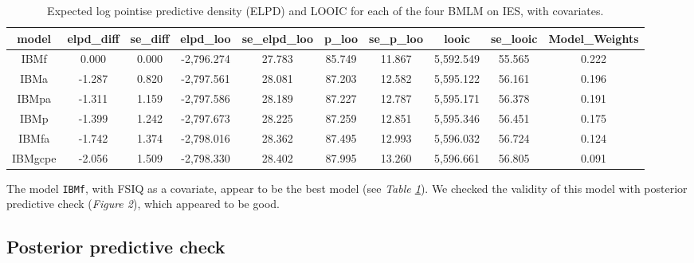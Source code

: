 \documentclass[
  11pt,
  english,
  ,doc,floatsintext]{apa6}
\begin{document}
\begin{table}[htb]

\begin{center}
\begin{threeparttable}

\caption{\label{tab:modelCompIES2}Expected log pointise predictive density (ELPD) and LOOIC for each of the four BMLM on IES, with covariates.}

\tiny{

\begin{tabular}{cccccccccc}
\toprule
model & \multicolumn{1}{c}{elpd\_diff} & \multicolumn{1}{c}{se\_diff} & \multicolumn{1}{c}{elpd\_loo} & \multicolumn{1}{c}{se\_elpd\_loo} & \multicolumn{1}{c}{p\_loo} & \multicolumn{1}{c}{se\_p\_loo} & \multicolumn{1}{c}{looic} & \multicolumn{1}{c}{se\_looic} & \multicolumn{1}{c}{Model\_Weights}\\
\midrule
IBMf & 0.000 & 0.000 & -2,796.274 & 27.783 & 85.749 & 11.867 & 5,592.549 & 55.565 & 0.222\\
IBMa & -1.287 & 0.820 & -2,797.561 & 28.081 & 87.203 & 12.582 & 5,595.122 & 56.161 & 0.196\\
IBMpa & -1.311 & 1.159 & -2,797.586 & 28.189 & 87.227 & 12.787 & 5,595.171 & 56.378 & 0.191\\
IBMp & -1.399 & 1.242 & -2,797.673 & 28.225 & 87.259 & 12.851 & 5,595.346 & 56.451 & 0.175\\
IBMfa & -1.742 & 1.374 & -2,798.016 & 28.362 & 87.495 & 12.993 & 5,596.032 & 56.724 & 0.124\\
IBMgcpe & -2.056 & 1.509 & -2,798.330 & 28.402 & 87.995 & 13.260 & 5,596.661 & 56.805 & 0.091\\
\bottomrule
\end{tabular}

}

\end{threeparttable}
\end{center}

\end{table}

The model \texttt{IBMf}, with FSIQ as a covariate, appear to be the best model (see \emph{Table \ref{tab:modelCompIES2}}). We checked the validity of this model with posterior predictive check (\emph{Figure 2}), which appeared to be good.

\hypertarget{posterior-predictive-check-1}{%
\subsection{Posterior predictive check}\label{posterior-predictive-check-1}}
\end{document}
